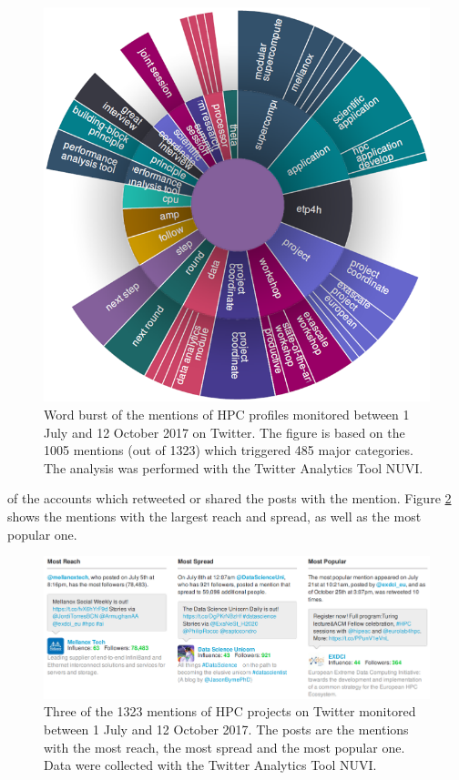 \begin{figure}[H] 
 \begin{center}
 \includegraphics[scale=0.57]{Images/HPC_word_burst.png}
 \caption{Word burst of the mentions of HPC profiles monitored between 1 July and 12 October 2017 on Twitter. The figure is based on the 1005 mentions (out of 1323) which triggered 485 major categories. The analysis was performed with the Twitter Analytics Tool NUVI.}
 \label{HPC_word_burst}
 \end{center}
\end{figure}

\noindent
of the accounts which retweeted or shared the posts with the mention. Figure \ref{HPC_Most_reach_spread_popular} shows the mentions with the largest reach and spread, as well as the most popular one. 

\begin{figure}[!t] 
 \begin{center}
 \includegraphics[scale=0.47]{Images/HPC_Most_reach_spread_popular.png}
 \caption{Three of the 1323 mentions of HPC projects on Twitter monitored between 1 July and 12 October 2017. The posts are the mentions with the most reach, the most spread and the most popular one. Data were collected with the Twitter Analytics Tool NUVI.}
 \label{HPC_Most_reach_spread_popular}
 \end{center}
\end{figure}

